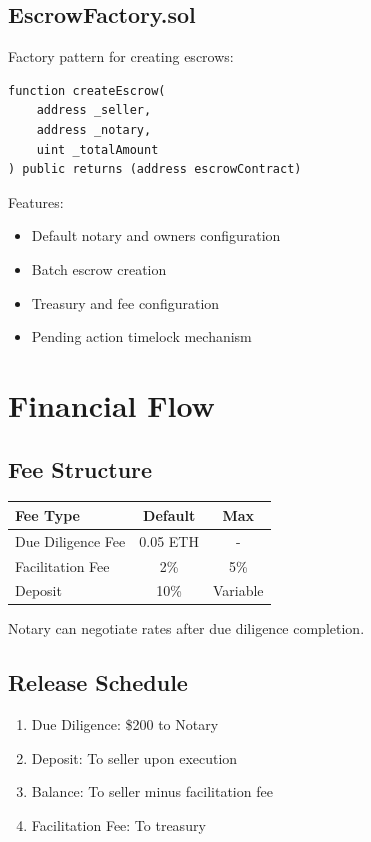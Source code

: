 \documentclass[12pt,a4paper]{article}
\begin{document}
\subsection{EscrowFactory.sol}
Factory pattern for creating escrows:

\begin{lstlisting}[language=Solidity]
function createEscrow(
    address _seller,
    address _notary,
    uint _totalAmount
) public returns (address escrowContract)
\end{lstlisting}

Features:
\begin{itemize}
\item Default notary and owners configuration
\item Batch escrow creation
\item Treasury and fee configuration
\item Pending action timelock mechanism
\end{itemize}

\section{Financial Flow}

\subsection{Fee Structure}
\begin{table}[h!]
\centering
\begin{tabular}{|l|c|c|}
\hline
Fee Type & Default & Max \\
\hline
Due Diligence Fee & 0.05 ETH & - \\
Facilitation Fee & 2\% & 5\% \\
Deposit & 10\% & Variable \\
\hline
\end{tabular}
\end{table}

Notary can negotiate rates after due diligence completion.

\subsection{Release Schedule}
\begin{enumerate}
\item Due Diligence: \$200 to Notary
\item Deposit: To seller upon execution
\item Balance: To seller minus facilitation fee
\item Facilitation Fee: To treasury
\end{enumerate}
\end{document}
